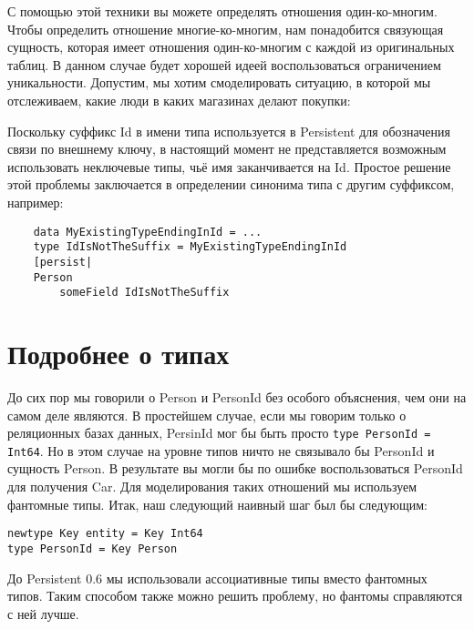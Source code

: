 
С помощью этой техники вы можете определять отношения один-ко-многим. Чтобы
определить отношение многие-ко-многим, нам понадобится связующая сущность,
которая имеет отношения один-ко-многим с каждой из оригинальных таблиц. В
данном случае будет хорошей идеей воспользоваться ограничением уникальности.
Допустим, мы хотим смоделировать ситуацию, в которой мы отслеживаем, какие люди
в каких магазинах делают покупки:


\begin{remark}
    Поскольку суффикс Id в имени типа используется в Persistent для обозначения
    связи по внешнему ключу, в настоящий момент не представляется возможным
    использовать неключевые типы, чьё имя заканчивается на Id. Простое решение
    этой проблемы заключается в определении синонима типа с другим суффиксом,
    например:

    \begin{lstlisting}
    data MyExistingTypeEndingInId = ...
    type IdIsNotTheSuffix = MyExistingTypeEndingInId
    [persist|
    Person
        someField IdIsNotTheSuffix
    \end{lstlisting}
\end{remark}

\section{Подробнее о типах}

До сих пор мы говорили о Person и PersonId без особого объяснения, чем они на
самом деле являются. В простейшем случае, если мы говорим только о реляционных
базах данных, PersinId мог бы быть просто \lstinline'type PersonId = Int64'. Но
в этом случае на уровне типов ничто не связывало бы PersonId и сущность Person.
В результате вы могли бы по ошибке воспользоваться PersonId для получения Car.
Для моделирования таких отношений мы используем фантомные типы. Итак, наш
следующий наивный шаг был бы следующим:

\begin{lstlisting}
newtype Key entity = Key Int64
type PersonId = Key Person
\end{lstlisting}

\begin{remark}
    До Persistent 0.6 мы использовали ассоциативные типы вместо фантомных
    типов. Таким способом также можно решить проблему, но фантомы справляются с
    ней лучше.
\end{remark}

